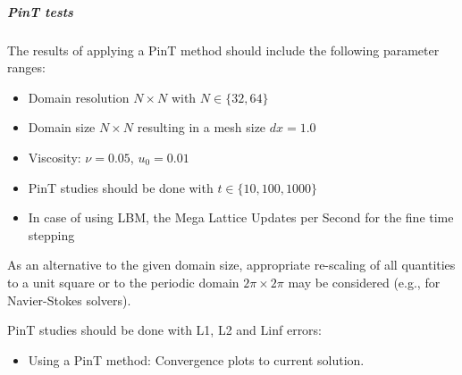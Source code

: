 \subparagraph{PinT tests}

The results of applying a PinT method should include the following parameter ranges:

\begin{itemize}
	\item Domain resolution $N\times N$ with $N \in \{ 32, 64\}$
	\item Domain size $N\times N$ resulting in a mesh size $dx=1.0$
	\item Viscosity: $\nu = 0.05$, $u_0 = 0.01$
	\item PinT studies should be done with $t \in \{ 10, 100, 1000 \}$
	\item In case of using LBM, the Mega Lattice Updates per Second for the fine time stepping
\end{itemize}
As an alternative to the given domain size, appropriate re-scaling of all quantities to a unit square or to the periodic domain $2\pi \times 2\pi$ may be considered (e.g., for Navier-Stokes solvers).

PinT studies should be done with L1, L2 and Linf errors:
\begin{itemize}
	\item Using a PinT method: Convergence plots to current solution.
\end{itemize}






%
%
%
%
%
%
%

